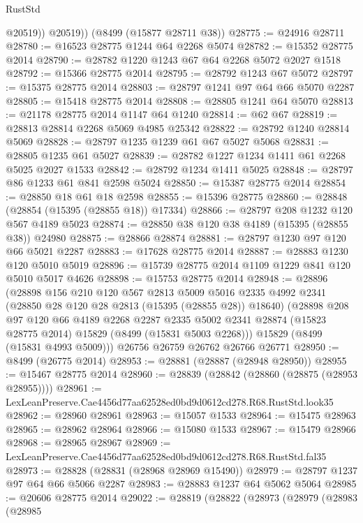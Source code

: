 \begin{lexlean}{RustStd}
\begin{coremodule}
            @20519))
        @20519))
    (@8499 (@15877 @28711 @38))
@28775 := @24916 @28711
@28780 := @16523 @28775 @1244 @64 @2268 @5074
@28782 := @15352 @28775 @2014
@28790 := @28782 @1220 @1243 @67 @64 @2268 @5072 @2027 @1518
@28792 := @15366 @28775 @2014
@28795 := @28792 @1243 @67 @5072
@28797 := @15375 @28775 @2014
@28803 := @28797 @1241 @97 @64 @66 @5070 @2287
@28805 := @15418 @28775 @2014
@28808 := @28805 @1241 @64 @5070
@28813 := @21178 @28775 @2014 @1147 @64 @1240
@28814 := @62 @67
@28819 := @28813 @28814 @2268 @5069 @4985 @25342
@28822 := @28792 @1240 @28814 @5069
@28828 := @28797 @1235 @1239 @61 @67 @5027 @5068
@28831 := @28805 @1235 @61 @5027
@28839 := @28782 @1227 @1234 @1411 @61 @2268 @5025 @2027 @1533
@28842 := @28792 @1234 @1411 @5025
@28848 := @28797 @86 @1233 @61 @841 @2598 @5024
@28850 := @15387 @28775 @2014
@28854 := @28850 @18 @61 @18 @2598
@28855 := @15396 @28775
@28860 := @28848 (@28854 (@15395 (@28855 @18)) @17334)
@28866 := @28797 @208 @1232 @120 @567 @4189 @5023
@28874 := @28850 @38 @120 @38 @4189 (@15395 (@28855 @38)) @24980
@28875 := @28866 @28874
@28881 := @28797 @1230 @97 @120 @66 @5021 @2287
@28883 := @17628 @28775 @2014
@28887 := @28883 @1230 @120 @5010 @5019
@28896 := @15739 @28775 @2014 @1109 @1229 @841 @120 @5010 @5017 @4626
@28898 := @15753 @28775 @2014
@28948 := @28896
    (@28898
      @156
      @210
      @120
      @567
      @2813
      @5009
      @5016
      @2335
      @4992
      @2341
      (@28850 @28 @120 @28 @2813 (@15395 (@28855 @28)) @18640)
      (@28898
        @208
        @97
        @120
        @66
        @4189
        @2268
        @2287
        @2335
        @5002
        @2341
        @28874
        (@15823 @28775 @2014)
        @15829
        (@8499 (@15831 @5003 @2268)))
      @15829
      (@8499 (@15831 @4993 @5009)))
    @26756
    @26759
    @26762
    @26766
    @26771
@28950 := @8499 (@26775 @2014)
@28953 := @28881 (@28887 (@28948 @28950))
@28955 := @15467 @28775 @2014
@28960 := @28839 (@28842 (@28860 (@28875 (@28953 @28955))))
@28961 := LexLeanPreserve.Cae4456d77aa62528ed0bd9d0612cd278.R68.RustStd.look35
@28962 := @28960 @28961
@28963 := @15057 @1533
@28964 := @15475 @28963
@28965 := @28962 @28964
@28966 := @15080 @1533
@28967 := @15479 @28966
@28968 := @28965 @28967
@28969 := LexLeanPreserve.Cae4456d77aa62528ed0bd9d0612cd278.R68.RustStd.fal35
@28973 := @28828 (@28831 (@28968 @28969 @15490))
@28979 := @28797 @1237 @97 @64 @66 @5066 @2287
@28983 := @28883 @1237 @64 @5062 @5064
@28985 := @20606 @28775 @2014
@29022 := @28819
    (@28822
      (@28973
        (@28979
          (@28983
            (@28985

\end{coremodule}
\end{lexlean}
